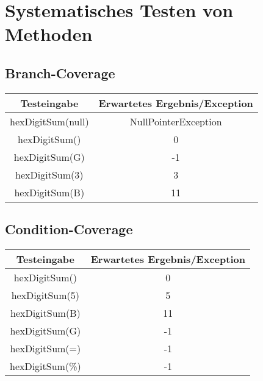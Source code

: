\chapter{Systematisches Testen von Methoden}
\section{Branch-Coverage}
\begin{center}
	\begin{tabular}{ c  c }
		\hline
		Testeingabe & Erwartetes Ergebnis/Exception \\
		\hline 
		hexDigitSum(null) & NullPointerException   \\  
		hexDigitSum() & 0   \\   
		hexDigitSum(G) & -1   \\
		hexDigitSum(3) & 3   \\
		hexDigitSum(B) &  11  \\
	\end{tabular}
\end{center}


\section{Condition-Coverage}
\begin{center}
	\begin{tabular}{ c c }
		\hline
		Testeingabe & Erwartetes Ergebnis/Exception \\
		\hline 
		hexDigitSum() &  0  \\  
		hexDigitSum(5) &  5  \\   
		hexDigitSum(B) &  11  \\
		hexDigitSum(G) &   -1 \\
		hexDigitSum(=) &   -1 \\
		hexDigitSum(\%) &  -1
	\end{tabular}
\end{center}